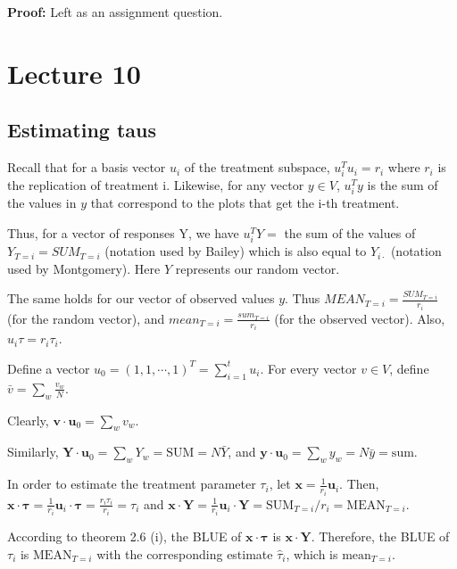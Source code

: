 \documentclass{tufte-book}
\begin{document}
\textbf{Proof:} Left as an assignment question.

\section{Lecture 10}

\subsection{Estimating taus}

Recall that for a basis vector $u_{i}$ of the treatment subspace, $u_{i}^{T} u_{i} = r_{i}$ where $r_{i}$ is the replication 
of treatment i. Likewise, for any vector $y \in V$, $u_{i}^{T}y$ is the sum of the values in $y$ that correspond to the plots 
that get the i-th treatment.  \newline


Thus, for a vector of responses Y, we have $u_{i}^{T}Y=$ the sum of the values of $Y_{T = i} = SUM_{T=i}$ (notation used by Bailey)
which is also equal to $Y_{i \cdot}$ (notation used by Montgomery). Here $Y$ represents our random vector. 


The same holds for our vector of observed values $y$. Thus $MEAN_{T = i} = \frac{SUM_{T = i}}{r_{i}}$ (for the random vector),
and $mean_{T = i} = \frac{sum_{T = i}}{r_{i}}$ (for the observed vector). Also, $u_{i} \tau = r_{i} \tau_{i}$. 

Define a vector $u_{0} = (1, 1,  \cdots, 1)^{T} = \sum_{i = 1}^{t} u_{i}$. For every vector $v \in V$, define 
$\bar{v} = \sum_{w} \frac{v_{w}}{N}$. 

Clearly, $\mathbf{v} \cdot \mathbf{u}_0 = \sum_w v_w$. \newline

Similarly, $\mathbf{Y} \cdot \mathbf{u}_0 = \sum_w Y_w = \text{SUM} = N\bar{Y}$, and $\mathbf{y} \cdot \mathbf{u}_0 = 
\sum_w y_w = N\bar{y} = \text{sum}$. \newline

In order to estimate the treatment parameter $\tau_i$, let $\mathbf{x} = \frac{1}{r_i} \mathbf{u}_i$.
Then, $\mathbf{x} \cdot \boldsymbol{\tau} = \frac{1}{r_i} \mathbf{u}_i \cdot \boldsymbol{\tau} = \frac{r_{i} \tau_{i}}{r_{i}}
 = \tau_i$ and $\mathbf{x} \cdot \mathbf{Y} = \frac{1}{r_i} \mathbf{u}_i \cdot \mathbf{Y} = \text{SUM}_{T=i}/r_i = \text{MEAN}_{T=i}$.

According to theorem 2.6 (i), the BLUE of $\mathbf{x} \cdot \boldsymbol{\tau}$ is $\mathbf{x} \cdot \mathbf{Y}$. 
Therefore, the BLUE of $\tau_{i}$ is $\text{MEAN}_{T=i}$ with the corresponding estimate $\hat{\tau}_i$, which is 
$\text{mean}_{T=i}$.
\end{document}
